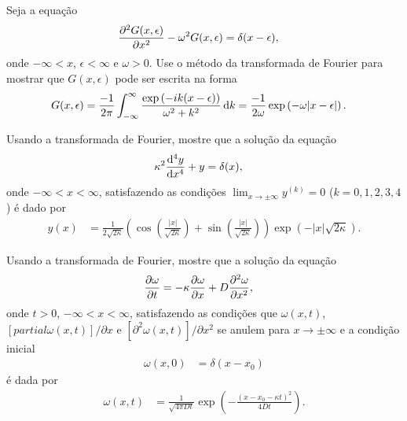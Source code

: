\documentclass[a4paper,12pt, leqno, answers]{exam}
\begin{document}
\thispagestyle{empty}

\newpage
\setcounter{page}{1}
\begin{questions}
    \question Seja a equa\c{c}\~{a}o
    \begin{align*}
        \frac{\partial ^2 G(x, \epsilon)}{\partial x^2} - \omega^2 G(x, \epsilon) &= \delta(x -
        \epsilon),
    \end{align*}
    onde $-\infty < x$, $\epsilon < \infty$ e $\omega > 0$. Use o m\'{e}todo da
    transformada de Fourier para mostrar que $G(x, \epsilon)$ pode ser escrita
    na forma
    \begin{align*}
        G(x, \epsilon) &= \frac{-1}{2\pi} \int_{-\infty}^\infty
        \frac{\exp\left( -i k (x - \epsilon) \right)}{\omega^2 + k^2} \, \mathrm{d}k =
        \frac{-1}{2 \omega} \exp\left( -\omega |x - \epsilon| \right).
    \end{align*}
    \begin{solution}
    \end{solution}

    \question Usando a transformada de Fourier, mostre que a solu\c{c}\~{a}o da
    equa\c{c}\~{a}o
    \begin{align*}
        \kappa^2 \frac{\mathrm{d} ^4 y}{\mathrm{d} x^4} + y &= \delta(x),
    \end{align*}
    onde $-\infty < x < \infty$, satisfazendo as condi\c{c}\~{o}es $\lim_{x \to
    \pm\infty} y^{(k)} = 0$ ($k = 0, 1, 2, 3, 4$) \'{e} dado por
    \begin{align*}
        y(x) &= \frac{1}{2 \sqrt{2\kappa}} \left( \cos\left(
        \frac{|x|}{\sqrt{2\kappa}} \right) + \sin\left(
        \frac{|x|}{\sqrt{2\kappa}} \right) \right) \exp\left( -|x|
        \sqrt{2\kappa} \right).
    \end{align*}
    \begin{solution}
    \end{solution}

    \question Usando a transformada de Fourier, mostre que a solu\c{c}\~{a}o da
    equa\c{c}\~{a}o
    \begin{align*}
        \frac{\partial \omega}{\partial t} &= -\kappa \frac{\partial \omega}{\partial x} + D \frac{\partial ^2 \omega}{\partial x^2},
    \end{align*}
    onde $t > 0$, $-\infty < x < \infty$, satisfazendo as condi\c{c}\~{o}es que
    $\omega(x, t)$, $\left[ partial \omega(x, t) \right] / \partial x$ e $\left[
    \partial^2 \omega(x, t) \right] / \partial x^2$ se anulem para $x \to \pm
    \infty$ e a condi\c{c}\~{a}o inicial
    \begin{align*}
        \omega(x, 0) &= \delta(x - x_0)
    \end{align*}
    \'{e} dada por
    \begin{align*}
        \omega(x, t) &= \frac{1}{\sqrt{4 \pi D t}} \exp\left( -
        \frac{(x - x_0 - \kappa t)^2}{4 D t} \right).
    \end{align*}
    \begin{solution}
    \end{solution}


\end{questions}
\end{document}
